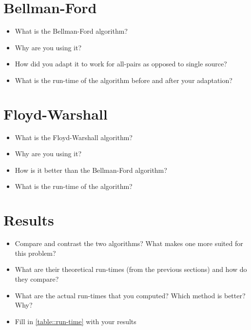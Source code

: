 \documentclass[twocolumn]{article}
\begin{document}
\section{Bellman-Ford}
\begin{itemize}
    \item What is the Bellman-Ford algorithm?
    \item Why are you using it?
    \item How did you adapt it to work for all-pairs as opposed to single
    source?
    \item What is the run-time of the algorithm before and after your
    adaptation?
\end{itemize}

\section{Floyd-Warshall}
\begin{itemize}
    \item What is the Floyd-Warshall algorithm?
    \item Why are you using it?
    \item How is it better than the Bellman-Ford algorithm?
    \item What is the run-time of the algorithm?
\end{itemize}

\section{Results}
\begin{itemize}
    \item Compare and contrast the two algorithms? What makes one more suited
    for this problem?
    \item What are their theoretical run-times (from the previous sections) and
    how do they compare?
    \item What are the actual run-times that you computed? Which method is
    better? Why?
    \item Fill in \cref{table::run-time} with your results
\end{itemize}
\end{document}
